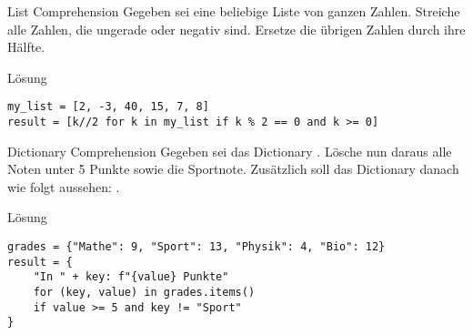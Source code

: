 \begin{fragile}[Übung]

\begin{block}{List Comprehension}
\vspace{2pt}
Gegeben sei eine beliebige Liste von ganzen Zahlen. Streiche alle Zahlen, die ungerade oder negativ sind. Ersetze die übrigen Zahlen durch ihre Hälfte. 
\end{block}


\vspace{12pt}

\begin{solutionblock}{Lösung}
\begin{verbatim}
my_list = [2, -3, 40, 15, 7, 8]
result = [k//2 for k in my_list if k % 2 == 0 and k >= 0]
\end{verbatim}
\end{solutionblock}

\end{fragile}


\begin{fragile}[Übung]

\begin{block}{Dictionary Comprehension}
\vspace{2pt}
Gegeben sei das Dictionary 
. 
Lösche nun daraus alle Noten unter 5 Punkte sowie die Sportnote. Zusätzlich soll das Dictionary danach wie folgt aussehen: 
. 

\end{block}


\vspace{12pt}

\begin{solutionblock}{Lösung}
\begin{verbatim}
grades = {"Mathe": 9, "Sport": 13, "Physik": 4, "Bio": 12}
result = {
    "In " + key: f"{value} Punkte"
    for (key, value) in grades.items()
    if value >= 5 and key != "Sport"
}
\end{verbatim}
\end{solutionblock}

\end{fragile}










